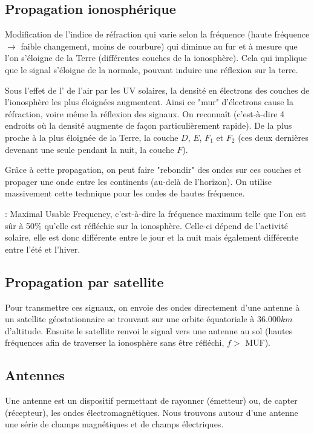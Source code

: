\subsection{Propagation ionosphérique}

Modification de l'indice de réfraction qui varie selon la fréquence (haute fréquence $\rightarrow$ faible changement, moins de courbure) qui diminue au fur et à mesure que l'on s'éloigne de la Terre (différentes couches de la ionosphère). Cela qui implique que le signal s'éloigne de la normale, pouvant induire une réflexion sur la terre.

Sous l'effet de l' de l'air par les UV solaires, la densité en électrons des couches de l'ionosphère les plus éloignées augmentent. Ainsi ce "mur" d'électrons cause la réfraction, voire même la réflexion des signaux. On reconnaît  (c'est-à-dire 4 endroits où la densité augmente de façon particulièrement rapide). De la plus proche à la plus éloignée de la Terre, la couche $D$, $E$, $F_1$ et $F_2$ (ces deux dernières devenant une seule pendant la nuit, la couche $F$).

Grâce à cette propagation, on peut faire "rebondir" des ondes sur ces couches et propager une onde entre les continents (au-delà de l'horizon). On utilise massivement cette technique pour les ondes de hautes fréquence.

 : Maximal Usable Frequency, c'est-à-dire la fréquence maximum telle que l'on est sûr à 50\% qu'elle est réfléchie sur la ionosphère. Celle-ci dépend de l'activité solaire, elle est donc différente entre le jour et la nuit mais également différente entre l'été et l'hiver.

\subsection{Propagation par satellite}

Pour transmettre ces signaux, on envoie des ondes directement d'une antenne à un satellite géostationnaire se trouvant sur une orbite équatoriale à $36.000km$ d'altitude. Ensuite le satellite renvoi le signal vers une antenne au sol (hautes fréquences afin de traverser la ionosphère sans être réfléchi, $f >$ MUF).

\subsection{Antennes}

Une antenne est un dispositif permettant de rayonner (émetteur) ou, de capter (récepteur), les ondes électromagnétiques. Nous trouvons autour d'une antenne une série de champs magnétiques et de champs électriques.

